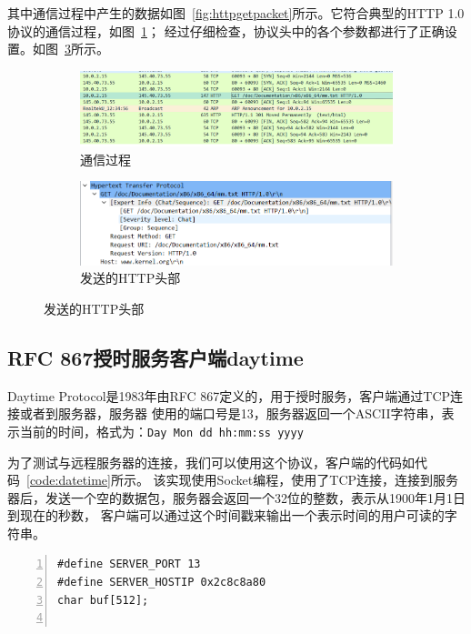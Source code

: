 \documentclass[a4paper,twoside]{ctexrep}
\begin{document}
\begin{spacing}{1.2}
其中通信过程中产生的数据如图~\ref{fig:httpgetpacket}所示。它符合典型的HTTP
1.0协议的通信过程，如图~\ref{fig:httpgetprocess}；
经过仔细检查，协议头中的各个参数都进行了正确设置。如图~\ref{fig:httpgetheader}所示。
\begin{figure}[htb]
	\centering
	\caption{httpget命令产生的数据包}
	\label{fig:httpgetpacket}
	\begin{subfigure}{0.4\textwidth}
		\centering
		\includegraphics[width=\textwidth]{httpgetpack.png}
		\caption{通信过程}
		\label{fig:httpgetprocess}
	\end{subfigure}
	\begin{subfigure}{0.4\textwidth}
		\centering
		\includegraphics[width=\textwidth]{httpheader.png}
		\caption{发送的HTTP头部}
		\label{fig:httpgetheader}
	\end{subfigure}
\end{figure}

\subsection{RFC 867授时服务客户端daytime}

Daytime Protocol是1983年由RFC 867定义的，用于授时服务，客户端通过TCP连接或者到服务器，服务器
使用的端口号是13，服务器返回一个ASCII字符串，表示当前的时间，格式为：\texttt{Day Mon dd hh:mm:ss yyyy}

为了测试与远程服务器的连接，我们可以使用这个协议，客户端的代码如代码~\ref{code:datetime}所示。
该实现使用Socket编程，使用了TCP连接，连接到服务器后，发送一个空的数据包，服务器会返回一个32位的整数，表示从1900年1月1日到现在的秒数，
客户端可以通过这个时间戳来输出一个表示时间的用户可读的字符串。

\begin{lstlisting}[numbers=left,style=CppStyle,caption={daytime客户端},label={code:datetime}]
#define SERVER_PORT 13
#define SERVER_HOSTIP 0x2c8c8a80
char buf[512];


\end{lstlisting}
\end{spacing}
\end{document}
